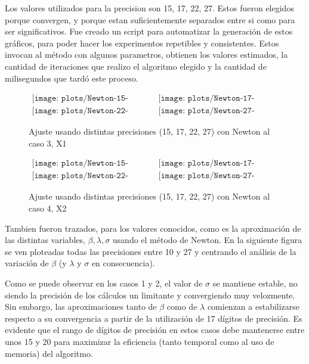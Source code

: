 Los valores utilizados para la precision son 15, 17, 22, 27. 
Estos fueron elegidos porque convergen, y porque estan suficientemente separados
entre si como para ser significativos. Fue creado un script para automatizar la 
generaci\'on de estos gr\'aficos, para poder hacer los experimentos repetibles 
y consistentes. Estos invocan al m\'etodo con algunos parametros, 
obtienen los valores estimados, la cantidad de iteraciones que realizo el 
algoritmo elegido y la cantidad de milisegundos que tard\'o este proceso.

\begin{figure} [H]
$\begin{array}{cc}
\texttt{[image: plots/Newton-15-caso3.png]} &
\texttt{[image: plots/Newton-17-caso3.png]} \\
\texttt{[image: plots/Newton-22-caso3.png]} &
\texttt{[image: plots/Newton-27-caso3.png]}
\end{array}$
\caption{Ajuste usando distintas precisiones (15, 17, 22, 27) con Newton al caso 3, X1}
\label{fig:FitCaso3Newton}
\end{figure}

\begin{figure} [H]
$\begin{array}{cc}
\texttt{[image: plots/Newton-15-caso4.png]} &
\texttt{[image: plots/Newton-17-caso4.png]} \\
\texttt{[image: plots/Newton-22-caso4.png]} &
\texttt{[image: plots/Newton-27-caso4.png]}
\end{array}$
\caption{Ajuste usando distintas precisiones (15, 17, 22, 27) con Newton al caso 4, X2}
\label{fig:FitCaso4Newton}
\end{figure}


Tambien fueron trazados, para los valores conocidos, como es la 
aproximaci\'on de las distintas variables, $\beta, \lambda, \sigma$ usando el 
m\'etodo de Newton. En la siguiente figura se ven ploteadas todas las 
precisiones entre 10 y 27 y centrando el an\'alisis de la variaci\'on de 
$\beta$ (y $\lambda$ y $\sigma$ en consecuencia).

Como se puede observar en los casos 1 y 2, el valor de $\sigma$ se mantiene 
estable, no siendo la precisi\'on de los c\'alculos un limitante y convergiendo 
muy velozmente. Sin embargo, las aproximaciones tanto de $\beta$ como de 
$\lambda$ comienzan a estabilizarse respecto a su convergencia a partir de la 
utilizaci\'on de 17 d\'igitos de precisi\'on. Es evidente que el rango de 
d\'igitos de precisi\'on en estos casos debe mantenerse entre unos 15 y 20 
para maximizar la eficiencia (tanto temporal como al uso de memoria) del 
algoritmo.  

